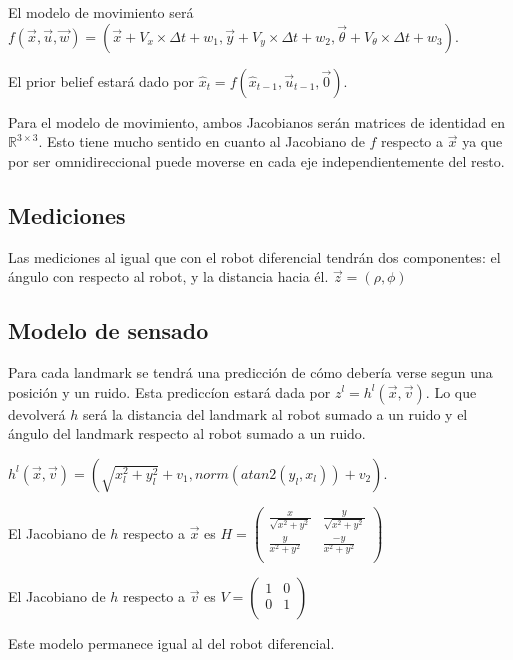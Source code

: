 \documentclass[a4paper]{article}
\newcommand{\real}{\ensuremath{\mathbb{R}}}
\theoremstyle{plain}
\theoremstyle{remark}
\theoremstyle{definition}
\begin{document}
El modelo de movimiento será $f(\vec{x}, \vec{u}, \vec{w}) = (\vec{x} + V_x \times \Delta t + w_1, \vec{y} + V_y \times \Delta t + w_2, \vec{\theta} + V_{\theta} \times \Delta t + w_3)$.

El prior belief estará dado por $\hat{x}_t = f(\hat{x}_{t - 1}, \vec{u}_{t - 1}, \vec{0})$.

Para el modelo de movimiento, ambos Jacobianos serán matrices de identidad en $\real^{3 \times 3}$. Esto tiene mucho sentido en cuanto al Jacobiano de $f$ respecto a $\vec{x}$ ya que por ser omnidireccional puede moverse en cada eje independientemente del resto.

\subsection*{Mediciones}

Las mediciones al igual que con el robot diferencial tendrán dos componentes: el ángulo con respecto al robot, y la distancia hacia él. $\vec{z} = (\rho, \phi)$

\subsection*{Modelo de sensado}

Para cada landmark se tendrá una predicción de cómo debería verse segun una posición y un ruido. Esta prediccíon estará dada por $z^l = h^l(\vec{x}, \vec{v})$. Lo que devolverá $h$ será la distancia del landmark al robot sumado a un ruido y el ángulo del landmark respecto al robot sumado a un ruido.

$h^l(\vec{x}, \vec{v}) = (\sqrt{x_l^2 + y_l^2} + v_1, norm(atan2(y_l, x_l)) + v_2)$.

El Jacobiano de $h$ respecto a $\vec{x}$ es $H = \left(
\begin{matrix}
\frac{x}{\sqrt{x^2 + y^2}} & \frac{y}{\sqrt{x^2 + y^2}} \\
\frac{y}{x^2 + y^2} & \frac{-y}{x^2 + y^2} \\
\end{matrix}
\right)$

El Jacobiano de $h$ respecto a $\vec{v}$ es $V = \left(
\begin{matrix}
1 & 0 \\
0 & 1 \\
\end{matrix}
\right)$

Este modelo permanece igual al del robot diferencial.
\end{document}
